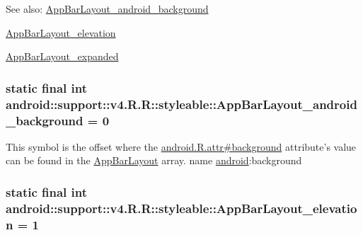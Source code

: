\begin{Desc}
\item[See also:]\hyperlink{classandroid_1_1support_1_1v4_1_1_r_1_1styleable_fce6e3c20cb96f7b80bda80af8f47843}{AppBarLayout\_\-android\_\-background} 

\hyperlink{classandroid_1_1support_1_1v4_1_1_r_1_1styleable_2f6bfe67d7eabf605f67fef684ca8ae1}{AppBarLayout\_\-elevation} 

\hyperlink{classandroid_1_1support_1_1v4_1_1_r_1_1styleable_4df0dd27ad44fc101d644efef542c6e3}{AppBarLayout\_\-expanded} \end{Desc}
\hypertarget{classandroid_1_1support_1_1v4_1_1_r_1_1styleable_fce6e3c20cb96f7b80bda80af8f47843}{
\subsubsection[{AppBarLayout\_\-android\_\-background}]{\setlength{\rightskip}{0pt plus 5cm}static final int android::support::v4.R.R::styleable::AppBarLayout\_\-android\_\-background = 0}}
\label{classandroid_1_1support_1_1v4_1_1_r_1_1styleable_fce6e3c20cb96f7b80bda80af8f47843}


This symbol is the offset where the \hyperlink{}{android.R.attr\#background} attribute's value can be found in the \hyperlink{classandroid_1_1support_1_1v4_1_1_r_1_1styleable_3a761a70ae130af1cc59eb59b6d9ebab}{AppBarLayout} array.  name \hyperlink{namespaceandroid}{android}:background \hypertarget{classandroid_1_1support_1_1v4_1_1_r_1_1styleable_2f6bfe67d7eabf605f67fef684ca8ae1}{
\subsubsection[{AppBarLayout\_\-elevation}]{\setlength{\rightskip}{0pt plus 5cm}static final int android::support::v4.R.R::styleable::AppBarLayout\_\-elevation = 1}}
\label{classandroid_1_1support_1_1v4_1_1_r_1_1styleable_2f6bfe67d7eabf605f67fef684ca8ae1}


